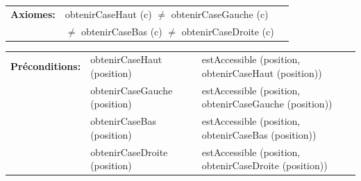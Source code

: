\documentclass[a4paper,11pt]{article}
\begin{document}
\noindent
\begin{tabular}{lll}
    \textbf{Axiomes:} & obtenirCaseHaut (c) $\neq$ obtenirCaseGauche (c)\\
     & $\neq$ obtenirCaseBas (c) $\neq$ obtenirCaseDroite (c) & \\
\end{tabular}

\noindent
\begin{tabular}{l p{4.5cm} p{6.5cm}}
    \textbf{Préconditions:} & obtenirCaseHaut (position) & estAccessible (position, obtenirCaseHaut (position))\\
     & obtenirCaseGauche (position) & estAccessible (position, obtenirCaseGauche (position))\\
     & obtenirCaseBas (position) & estAccessible (position, obtenirCaseBas (position))\\
     & obtenirCaseDroite (position) & estAccessible (position, obtenirCaseDroite (position))\\
\end{tabular}
\end{document}
